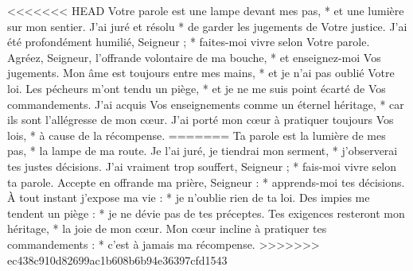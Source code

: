 <<<<<<< HEAD
Votre parole est une lampe devant mes pas, * et une lumière sur mon sentier.
\versseparator
J'ai juré et résolu * de garder les jugements de Votre justice.
\versseparator
J'ai été profondément humilié, Seigneur ; * faites-moi vivre selon Votre parole.
\versseparator
Agréez, Seigneur, l'offrande volontaire de ma bouche, * et enseignez-moi Vos jugements.
\versseparator
Mon âme est toujours entre mes mains, * et je n'ai pas oublié Votre loi.
\versseparator
Les pécheurs m'ont tendu un piège, * et je ne me suis point écarté de Vos commandements.
\versseparator
J'ai acquis Vos enseignements comme un éternel héritage, * car ils sont l'allégresse de mon cœur.
\versseparator
J'ai porté mon cœur à pratiquer toujours Vos lois, * à cause de la récompense.
=======
Ta parole est la lumière de mes pas, *
la lampe de ma route.
\versseparator
Je l’ai juré, je tiendrai mon serment, *
j’observerai tes justes décisions.
\versseparator
J’ai vraiment trop souffert, Seigneur ; *
fais-moi vivre selon ta parole.
\versseparator
Accepte en offrande ma prière, Seigneur : *
apprends-moi tes décisions.
\versseparator
À tout instant j’expose ma vie : *
je n’oublie rien de ta loi.
\versseparator
Des impies me tendent un piège : *
je ne dévie pas de tes préceptes.
\versseparator
Tes exigences resteront mon héritage, *
la joie de mon cœur.
\versseparator
Mon cœur incline à pratiquer tes commandements : *
c’est à jamais ma récompense.
>>>>>>> ec438c910d82699ac1b608b6b94e36397cfd1543
